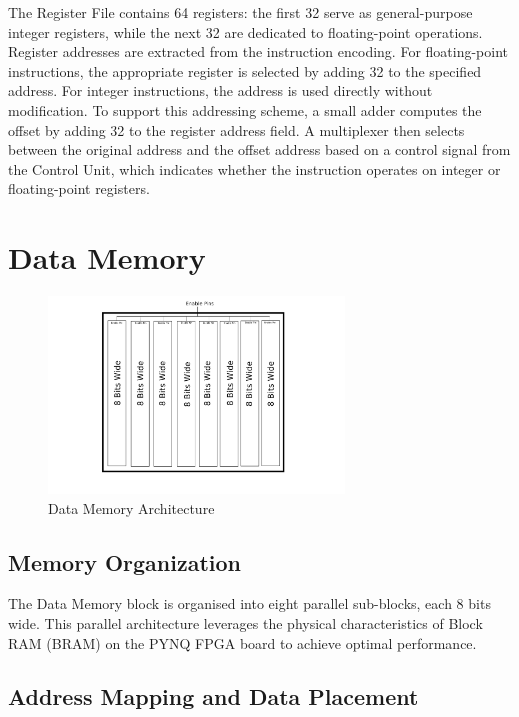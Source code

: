 \documentclass{article}
\begin{document}
The Register File contains 64 registers: the first 32 serve as general-purpose integer registers, while the next 32 are dedicated to floating-point operations. Register addresses are extracted from the instruction encoding. For floating-point instructions, the appropriate register is selected by adding 32 to the specified address. For integer instructions, the address is used directly without modification. To support this addressing scheme, a small adder computes the offset by adding 32 to the register address field. A multiplexer then selects between the original address and the offset address based on a control signal from the Control Unit, which indicates whether the instruction operates on integer or floating-point registers.

\section*{Data Memory}

\begin{figure}[H]
    \centering
    \includegraphics[width=0.7\textwidth]{data_memory.png}
    \caption{Data Memory Architecture}
    \label{fig:data_memory}
\end{figure}

\subsection*{Memory Organization}

The Data Memory block is organised into eight parallel sub-blocks, each 8 bits wide. This parallel architecture leverages the physical characteristics of Block RAM (BRAM) on the PYNQ FPGA board to achieve optimal performance.

\subsection*{Address Mapping and Data Placement}
\end{document}
